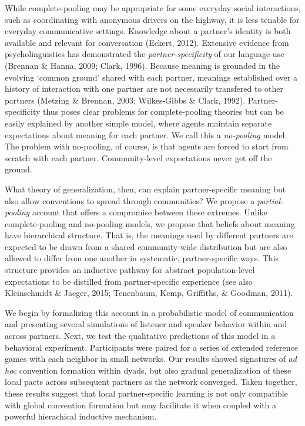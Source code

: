 \documentclass[10pt, letterpaper]{article}
\begin{document}
While complete-pooling may be appropriate for some everyday social
interactions, such as coordinating with anonymous drivers on the
highway, it is less tenable for everyday communicative settings.
Knowledge about a partner's identity is both available and relevant for
conversation (Eckert, 2012). Extensive evidence from psycholinguistics
has demonstrated the \emph{partner-specificity} of our language use
(Brennan \& Hanna, 2009; Clark, 1996). Because meaning is grounded in
the evolving `common ground' shared with each partner, meanings
established over a history of interaction with one partner are not
necessarily transfered to other partners (Metzing \& Brennan, 2003;
Wilkes-Gibbs \& Clark, 1992). Partner-specificity thus poses clear
problems for complete-pooling theories but can be easily explained by
another simple model, where agents maintain separate expectations about
meaning for each partner. We call this a \emph{no-pooling} model. The
problem with no-pooling, of course, is that agents are forced to start
from scratch with each partner. Community-level expectations never get
off the ground.

What theory of generalization, then, can explain partner-specific
meaning but also allow conventions to spread through communities? We
propose a \emph{partial-pooling} account that offers a compromise
between these extremes. Unlike complete-pooling and no-pooling models,
we propose that beliefs about meaning have hierarchical structure. That
is, the meanings used by different partners are expected to be drawn
from a shared community-wide distribution but are also allowed to differ
from one another in systematic, partner-specific ways. This structure
provides an inductive pathway for abstract population-level expectations
to be distilled from partner-specific experience (see also Kleinschmidt
\& Jaeger, 2015; Tenenbaum, Kemp, Griffiths, \& Goodman, 2011).

We begin by formalizing this account in a probabilistic model of
communication and presenting several simulations of listener and speaker
behavior within and across partners. Next, we test the qualitative
predictions of this model in a behavioral experiment. Participants were
paired for a series of extended reference games with each neighbor in
small networks. Our results showed signatures of \emph{ad hoc}
convention formation within dyads, but also gradual generalization of
these local pacts across subsequent partners as the network converged.
Taken together, these results suggest that local partner-specific
learning is not only compatible with global convention formation but may
facilitate it when coupled with a powerful hierachical inductive
mechanism.
\end{document}
